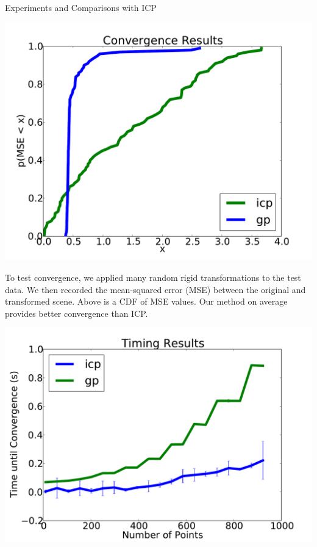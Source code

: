 \documentclass[final]{beamer}
\begin{document}
\begin{frame}{}
\begin{textblock}{27}
\begin{block}{Experiments and Comparisons with ICP}





\begin{center}
\includegraphics[width=8.6in]{convergence2.pdf}
\end{center}


To test convergence, we applied many random rigid transformations to the test data. We then recorded the mean-squared error (MSE) between the original and transformed scene. Above is a CDF of MSE values. Our method on average provides better convergence than ICP.

\begin{center}
\includegraphics[width=8.7in]{scaling2.pdf}
\end{center}


\end{block}
\end{textblock}
\end{frame}
\end{document}
